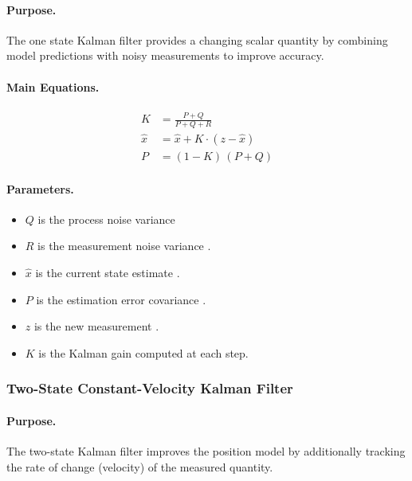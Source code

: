 \paragraph{Purpose.}
The one state Kalman filter provides a changing scalar quantity by combining model predictions with noisy measurements to improve accuracy.

\paragraph{Main Equations.}
\begin{align}
    K &= \frac{P + Q}{P + Q + R} \label{eq:kalman1_gain} \\[4pt]
    \hat{x} &= \hat{x} + K \cdot (z - \hat{x}) \label{eq:kalman1_state} \\[4pt]
    P &= (1 - K)\,(P + Q) \label{eq:kalman1_cov}
\end{align}

\paragraph{Parameters.}
\begin{itemize}
\item $Q$ is the process noise variance 
\item $R$ is the measurement noise variance . 
\item $\hat{x}$ is the current state estimate . 
\item $P$ is the estimation error covariance .
\item $z$ is the new measurement . 
\item $K$ is the Kalman gain computed at each step.
\end{itemize}
\subsubsection{Two-State Constant-Velocity Kalman Filter}

\paragraph{Purpose.}
The two-state Kalman filter improves the position model by additionally tracking 
the rate of change (velocity) of the measured quantity.

